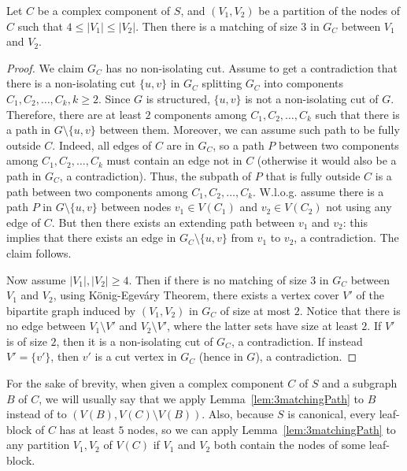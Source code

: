 \documentclass{article}
\begin{document}
\begin{lemma}\label{lem:3matchingPath}
    Let $C$ be a complex component of $S$, and $(V_1, V_2)$ be a partition of the nodes of $C$ such that $4\leq |V_1|\leq |V_2|$. Then there is a matching of size $3$ in $G_C$ between $V_1$ and $V_2$.
\end{lemma}
\begin{proof}
    We claim $G_C$ has no non-isolating cut. Assume to get a contradiction that there is a non-isolating cut $\{u, v\}$ in $G_C$ splitting $G_C$ into components $C_1, C_2, \dots, C_k, k\geq 2$. Since $G$ is structured, $\{u, v\}$ is not a non-isolating cut of $G$. Therefore, there are at least $2$ components among $C_1, C_2, \dots, C_k$ such that there is a path in $G\setminus\{u, v\}$ between them. Moreover, we can assume such path to be fully outside $C$. Indeed, all edges of $C$ are in $G_C$, so a path $P$ between two components among $C_1, C_2, \dots, C_k$ must contain an edge not in $C$ (otherwise it would also be a path in $G_C$, a contradiction). Thus, the subpath of $P$ that is fully outside $C$ is a path between two components among $C_1, C_2, \dots, C_k$. W.l.o.g. assume there is a path $P$ in $G\setminus\{u, v\}$ between nodes $v_1\in V(C_1)$ and $v_2\in V(C_2)$ not using any edge of $C$. But then there exists an extending path between $v_1$ and $v_2$: this implies that there exists an edge in $G_C\setminus\{u, v\}$ from $v_1$ to $v_2$, a contradiction. The claim follows.
    
    Now assume $|V_1|,|V_2|\ge 4$. Then if there is no matching of size $3$ in $G_C$ between $V_1$ and $V_2$, using König-Egeváry Theorem, there exists a vertex cover $V'$ of the bipartite graph induced by $(V_1,V_2)$ in $G_C$ of size at most $2$. Notice that there is no edge between $V_1\setminus V'$ and $V_2\setminus V'$, where the latter sets have size at least $2$. If $V'$ is of size $2$, then it is a non-isolating cut of $G_C$, a contradiction. If instead $V'=\{v'\}$, then $v'$ is a cut vertex in $G_C$ (hence in $G$), a contradiction.
\end{proof}

For the sake of brevity, when given a complex component $C$ of $S$ and a subgraph $B$ of $C$, we will usually say that we apply Lemma~\ref{lem:3matchingPath} to $B$ instead of to $(V(B), V(C)\setminus V(B))$. Also, because $S$ is canonical, every leaf-block of $C$ has at least $5$ nodes, so we can apply Lemma~\ref{lem:3matchingPath} to any partition $V_1, V_2$ of $V(C)$ if $V_1$ and $V_2$ both contain the nodes of some leaf-block. 
\end{document}
